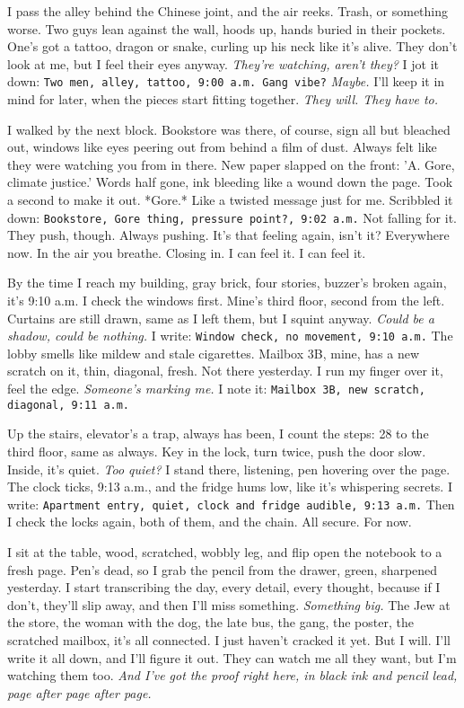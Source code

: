 \documentclass[12pt]{article}
\newcommand{\note}[1]{\texttt{#1}}
\begin{document}
I pass the alley behind the Chinese joint, and the air reeks. Trash, or something worse. Two guys lean against the wall, hoods up, hands buried in their pockets. One’s got a tattoo, dragon or snake, curling up his neck like it’s alive. They don’t look at me, but I feel their eyes anyway. \textit{They’re watching, aren’t they?} I jot it down: \note{Two men, alley, tattoo, 9:00 a.m. Gang vibe?} \textit{Maybe.} I’ll keep it in mind for later, when the pieces start fitting together. \textit{They will. They have to.}

I walked by the next block. Bookstore was there, of course, sign all but bleached out, windows like eyes peering out from behind a film of dust. Always felt like they were watching you from in there.  New paper slapped on the front: 'A. Gore, climate justice.' Words half gone, ink bleeding like a wound down the page. Took a second to make it out.  *Gore.*  Like a twisted message just for me.  Scribbled it down: \note{Bookstore, Gore thing, pressure point?, 9:02 a.m.}  Not falling for it.  They push, though.  Always pushing.  It's that feeling again, isn't it?  Everywhere now.  In the air you breathe. Closing in. I can feel it.  I can feel it.

By the time I reach my building, gray brick, four stories, buzzer’s broken again, it’s 9:10 a.m. I check the windows first. Mine’s third floor, second from the left. Curtains are still drawn, same as I left them, but I squint anyway. \textit{Could be a shadow, could be nothing.} I write: \note{Window check, no movement, 9:10 a.m.} The lobby smells like mildew and stale cigarettes. Mailbox 3B, mine, has a new scratch on it, thin, diagonal, fresh. Not there yesterday. I run my finger over it, feel the edge. \textit{Someone’s marking me.} I note it: \note{Mailbox 3B, new scratch, diagonal, 9:11 a.m.}

Up the stairs, elevator’s a trap, always has been, I count the steps: 28 to the third floor, same as always. Key in the lock, turn twice, push the door slow. Inside, it’s quiet. \textit{Too quiet?} I stand there, listening, pen hovering over the page. The clock ticks, 9:13 a.m., and the fridge hums low, like it’s whispering secrets. I write: \note{Apartment entry, quiet, clock and fridge audible, 9:13 a.m.} Then I check the locks again, both of them, and the chain. All secure. For now.

I sit at the table, wood, scratched, wobbly leg, and flip open the notebook to a fresh page. Pen’s dead, so I grab the pencil from the drawer, green, sharpened yesterday. I start transcribing the day, every detail, every thought, because if I don’t, they’ll slip away, and then I’ll miss something. \textit{Something big.} The Jew at the store, the woman with the dog, the late bus, the gang, the poster, the scratched mailbox, it’s all connected. I just haven’t cracked it yet. But I will. I’ll write it all down, and I’ll figure it out. They can watch me all they want, but I’m watching them too. \textit{And I’ve got the proof right here, in black ink and pencil lead, page after page after page.}
\end{document}
